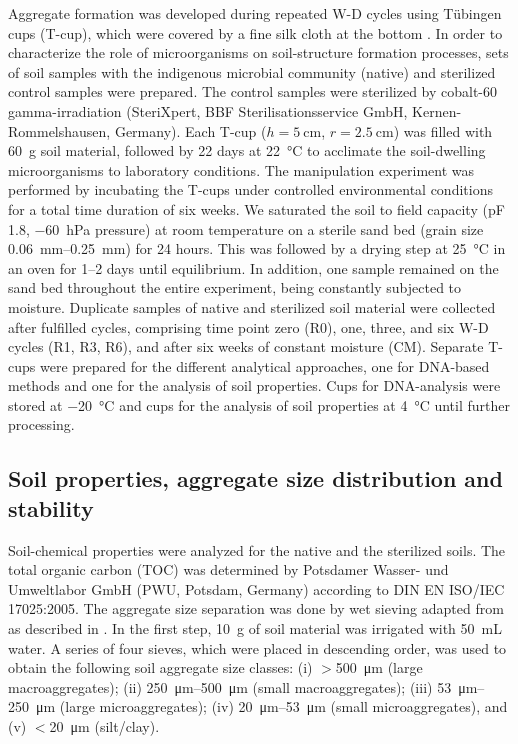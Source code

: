 Aggregate formation was developed during repeated W-D cycles using T{\"u}bingen cups (T-cup), which were covered by a fine silk cloth at the bottom \citep{Scholten2011}. In order to characterize the role of microorganisms on soil-structure formation processes, sets of soil samples with the indigenous microbial community (native) and sterilized control samples were prepared. The control samples were sterilized by cobalt-60 gamma-irradiation (SteriXpert, BBF Sterilisationsservice GmbH, Kernen-Rommelshausen, Germany). Each T-cup (\(h = \SI{5}{\centi\metre}\), \(r = \SI{2.5}{\centi\metre}\)) was filled with \SI{60}{\gram} soil material, followed by 22 days at \SI{22}{\degreeCelsius} to acclimate the soil-dwelling microorganisms to laboratory conditions. The manipulation experiment was performed by incubating the T-cups under controlled environmental conditions for a total time duration of six weeks. We saturated the soil to field capacity (pF 1.8, \SI{-60}{\hecto\pascal} pressure) at room temperature on a sterile sand bed (grain size \SIrange{0.06}{0.25}{\milli\metre}) for 24 hours. This was followed by a drying step at \SI{25}{\degreeCelsius} in an oven for 1--2 days until equilibrium. In addition, one sample remained on the sand bed throughout the entire experiment, being constantly subjected to moisture. Duplicate samples of native and sterilized soil material were collected after fulfilled cycles, comprising time point zero (R0), one, three, and six W-D cycles (R1, R3, R6), and after six weeks of constant moisture (CM). Separate T-cups were prepared for the different analytical approaches, one for DNA-based methods and one for the analysis of soil properties. Cups for DNA-analysis were stored at \SI{-20}{\degreeCelsius} and cups for the analysis of soil properties at \SI{4}{\degreeCelsius} until further processing.

\subsection{Soil properties, aggregate size distribution and stability}

Soil-chemical properties were analyzed for the native and the sterilized soils. The total organic carbon (TOC) was determined by Potsdamer Wasser- und Umweltlabor GmbH (PWU, Potsdam, Germany) according to DIN EN ISO/IEC 17025:2005. The aggregate size separation was done by wet sieving adapted from \citet{Elliott1986} as described in \citet{RiverasMunoz2022}. In the first step, \SI{10}{\gram} of soil material was irrigated with \SI{50}{\milli\liter} water. A series of four sieves, which were placed in descending order, was used to obtain the following soil aggregate size classes: (i) $>$\SI{500}{\micro\meter} (large macroaggregates); (ii) \SIrange{250}{500}{\micro\meter} (small macroaggregates); (iii) \SIrange{53}{250}{\micro\meter} (large microaggregates); (iv) \SIrange{20}{53}{\micro\meter} (small microaggregates), and (v) $<$\SI{20}{\micro\meter} (silt/clay).

